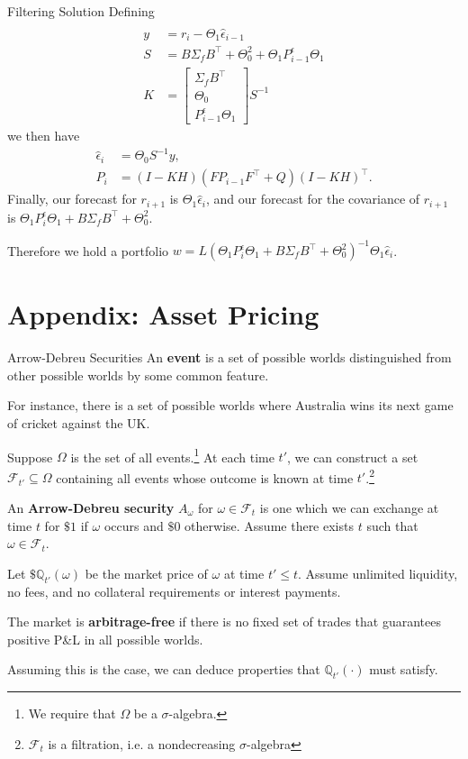 \documentclass{beamer}
\begin{document}
\begin{frame}{Filtering Solution}
	Defining
	\begin{align*}
	\\	y				&= r_i - \Theta_1 \hat{\epsilon}_{i-1}
	\\	S				&= B\Sigma_f B^\top + \Theta_0^2 + \Theta_1 P^\epsilon_{i-1}\Theta_1
	\\	K				&= \left[\begin{matrix}\Sigma_f B^\top \\ \Theta_0 \\ P^\epsilon_{i-1} \Theta_1 \end{matrix}\right] S^{-1} 
	\end{align*}
	we then have
	\begin{align*}
		\hat{\epsilon}_i&= \Theta_0 S^{-1} y,
	\\	P_i		&= (I-KH) (F P_{i-1} F^\top + Q) (I-KH)^\top.
	\end{align*}
	Finally, our forecast for $r_{i+1}$ is $\Theta_1\hat{\epsilon}_i$, and our forecast for the covariance of $r_{i+1}$ is $\Theta_1 P^\epsilon_i \Theta_1 + B\Sigma_f B^\top+\Theta_0^2$.

	Therefore we hold a portfolio $w = L(\Theta_1 P^\epsilon_i \Theta_1 + B\Sigma_f B^\top + \Theta_0^2)^{-1} \Theta_1\hat{\epsilon}_i$.
\end{frame}

\section{Appendix: Asset Pricing}
\begin{frame}{Arrow-Debreu Securities}
	An \textbf{event} is a set of possible worlds distinguished from other possible worlds by some common feature.

	For instance, there is a set of possible worlds where Australia wins its next game of cricket against the UK.%

	Suppose $\Omega$ is the set of all events.\footnote{We require that $\Omega$ be a $\sigma$-algebra.} At each time $t'$, we can construct a set $\mathcal{F}_{t'}\subseteq \Omega$ containing all events whose outcome is known at time $t'$.\footnote{$\mathcal{F}_t$ is a filtration, i.e. a nondecreasing $\sigma$-algebra}

	An \textbf{Arrow-Debreu security} $A_\omega$ for $\omega\in \mathcal{F}_t$ is one which we can exchange at time $t$ for $\$1$ if $\omega$ occurs and $\$0$ otherwise. Assume there exists $t$ such that $\omega\in\mathcal{F}_t$.

	Let $\$\mathbb{Q}_{t'}(\omega)$ be the market price of $\omega$ at time $t'\leq t$. Assume unlimited liquidity, no fees, and no collateral requirements or interest payments.

	The market is \textbf{arbitrage-free} if there is no fixed set of trades that guarantees positive P\&L in all possible worlds.

	Assuming this is the case, we can deduce properties that $\mathbb{Q}_{t'}(\cdot)$ must satisfy.
\end{frame}
\end{document}

